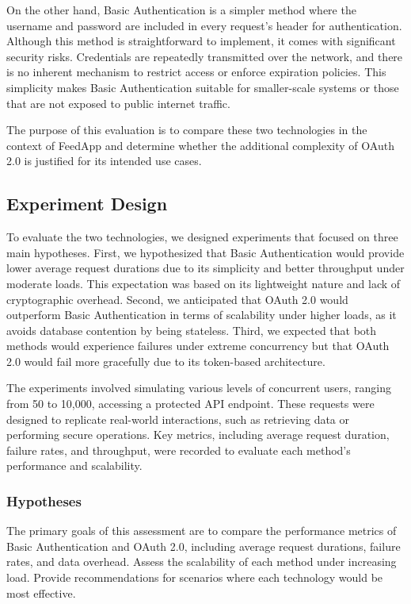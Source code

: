 On the other hand, Basic Authentication is a simpler method where the username and password are included in every request’s header for authentication. Although this method is straightforward to implement, it comes with significant security risks. Credentials are repeatedly transmitted over the network, and there is no inherent mechanism to restrict access or enforce expiration policies. This simplicity makes Basic Authentication suitable for smaller-scale systems or those that are not exposed to public internet traffic.

The purpose of this evaluation is to compare these two technologies in the context of FeedApp and determine whether the additional complexity of OAuth 2.0 is justified for its intended use cases.

\subsection{Experiment Design}
To evaluate the two technologies, we designed experiments that focused on three main hypotheses. First, we hypothesized that Basic Authentication would provide lower average request durations due to its simplicity and better throughput under moderate loads. This expectation was based on its lightweight nature and lack of cryptographic overhead. Second, we anticipated that OAuth 2.0 would outperform Basic Authentication in terms of scalability under higher loads, as it avoids database contention by being stateless. Third, we expected that both methods would experience failures under extreme concurrency but that OAuth 2.0 would fail more gracefully due to its token-based architecture.

The experiments involved simulating various levels of concurrent users, ranging from 50 to 10,000, accessing a protected API endpoint. These requests were designed to replicate real-world interactions, such as retrieving data or performing secure operations. Key metrics, including average request duration, failure rates, and throughput, were recorded to evaluate each method’s performance and scalability.

\subsubsection*{Hypotheses}
The primary goals of this assessment are to compare the performance metrics of Basic Authentication and OAuth 2.0, including average request durations, failure rates, and data overhead. Assess the scalability of each method under increasing load. Provide recommendations for scenarios where each technology would be most effective.

